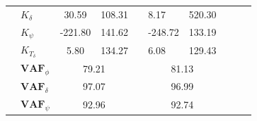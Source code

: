 \begin{table}[]
\begin{tabular}{llcc|llllll}
                                                 & $K_\delta $           & 30.59                                      & 108.31                                               &                                              & 8.17                   & 520.30                          &  &  &  \\
                                                 & $K_\psi $             & -221.80                                    & 141.62                                               &                                              & -248.72                & 133.19                          &  &  &  \\
                                                 & $K_{T_\delta}$        & 5.80                                       & 134.27                                               &                                              & 6.08                   & 129.43                          &  &  &  \\ \cline{2-4} \cline{6-7}
                                                 & $\mathbf{VAF}_\phi$   & \multicolumn{2}{c|}{79.21}                                                                        &                                              & \multicolumn{2}{c}{81.13}                                &  &  &  \\
                                                 & $\mathbf{VAF}_\delta$ & \multicolumn{2}{c|}{97.07}                                                                        &                                              & \multicolumn{2}{c}{96.99}                                &  &  &  \\
                                                 & $\mathbf{VAF}_\psi$   & \multicolumn{2}{c|}{92.96}                                                                        &                                              & \multicolumn{2}{c}{92.74}                                &  &  & 
    \end{tabular}
    \label{tb:reduced}

    \end{table}
